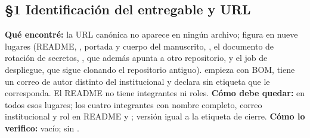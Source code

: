 \subsection*{\S1 Identificaci\'on del entregable y URL}
\textbf{Qu\'e encontr\'e:} la URL can\'onica no aparece en ning\'un archivo;  figura en nueve lugares (README, , portada y cuerpo del manuscrito, , el documento de rotaci\'on de secretos, , que adem\'as apunta a otro repositorio, y el job de despliegue, que sigue clonando el repositorio antiguo).  empieza con BOM, tiene un correo de autor distinto del institucional y declara  sin etiqueta que le corresponda. El README no tiene integrantes ni roles. \textbf{C\'omo debe quedar:}  en todos esos lugares; los cuatro integrantes con nombre completo, correo institucional y rol en README y ; versi\'on igual a la etiqueta de cierre. \textbf{C\'omo lo verifico:}  vac\'io;  sin .

